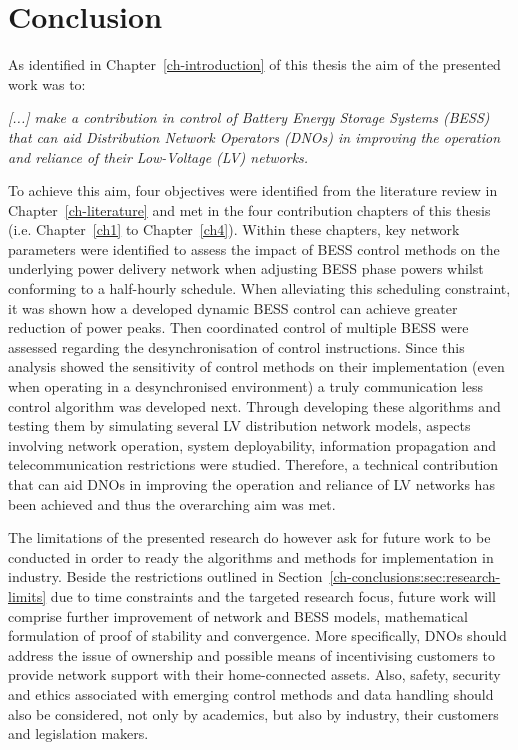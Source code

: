 \section{Conclusion}
\label{ch-conclusions:sec:conclusion}

As identified in Chapter~\ref{ch-introduction} of this thesis the aim of the presented work was to:

\textit{[...] make a contribution in control of Battery Energy Storage Systems (BESS) that can aid Distribution Network Operators (DNOs) in improving the operation and reliance of their Low-Voltage (LV) networks.}

To achieve this aim, four objectives were identified from the literature review in Chapter~\ref{ch-literature} and met in the four contribution chapters of this thesis (i.e. Chapter~\ref{ch1} to Chapter~\ref{ch4}).
Within these chapters, key network parameters were identified to assess the impact of BESS control methods on the underlying power delivery network when adjusting BESS phase powers whilst conforming to a half-hourly schedule.
When alleviating this scheduling constraint, it was shown how a developed dynamic BESS control can achieve greater reduction of power peaks.
Then coordinated control of multiple BESS were assessed regarding the desynchronisation of control instructions.
Since this analysis showed the sensitivity of control methods on their implementation (even when operating in a desynchronised environment) a truly communication less control algorithm was developed next.
Through developing these algorithms and testing them by simulating several LV distribution network models, aspects involving network operation, system deployability, information propagation and telecommunication restrictions were studied.
Therefore, a technical contribution that can aid DNOs in improving the operation and reliance of LV networks has been achieved and thus the overarching aim was met.

The limitations of the presented research do however ask for future work to be conducted in order to ready the algorithms and methods for implementation in industry.
Beside the restrictions outlined in Section~\ref{ch-conclusions:sec:research-limits} due to time constraints and the targeted research focus, future work will comprise further improvement of network and BESS models, mathematical formulation of proof of stability and convergence.
More specifically, DNOs should address the issue of ownership and possible means of incentivising customers to provide network support with their home-connected assets.
Also, safety, security and ethics associated with emerging control methods and data handling should also be considered, not only by academics, but also by industry, their customers and legislation makers.

